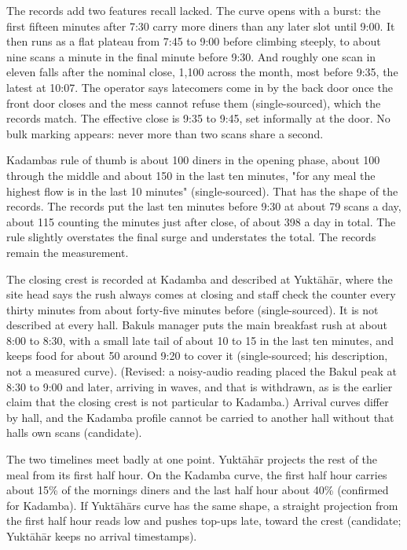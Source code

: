 \documentclass[
  10pt,
  table]{article}
\begin{document}
The records add two features recall lacked. The curve opens with a burst: the first fifteen minutes after 7:30 carry more diners than any later slot until 9:00. It then runs as a flat plateau from 7:45 to 9:00 before climbing steeply, to about nine scans a minute in the final minute before 9:30. And roughly one scan in eleven falls after the nominal close, 1,100 across the month, most before 9:35, the latest at 10:07. The operator says latecomers come in by the back door once the front door closes and the mess cannot refuse them (single-sourced), which the records match. The effective close is 9:35 to 9:45, set informally at the door. No bulk marking appears: never more than two scans share a second.

Kadamba\textquotesingle s rule of thumb is about 100 diners in the opening phase, about 100 through the middle and about 150 in the last ten minutes, "for any meal the highest flow is in the last 10 minutes" (single-sourced). That has the shape of the records. The records put the last ten minutes before 9:30 at about 79 scans a day, about 115 counting the minutes just after close, of about 398 a day in total. The rule slightly overstates the final surge and understates the total. The records remain the measurement.

The closing crest is recorded at Kadamba and described at Yuktāhār, where the site head says the rush always comes at closing and staff check the counter every thirty minutes from about forty-five minutes before (single-sourced). It is not described at every hall. Bakul\textquotesingle s manager puts the main breakfast rush at about 8:00 to 8:30, with a small late tail of about 10 to 15 in the last ten minutes, and keeps food for about 50 around 9:20 to cover it (single-sourced; his description, not a measured curve). (Revised: a noisy-audio reading placed the Bakul peak at 8:30 to 9:00 and later, arriving in waves, and that is withdrawn, as is the earlier claim that the closing crest is not particular to Kadamba.) Arrival curves differ by hall, and the Kadamba profile cannot be carried to another hall without that hall\textquotesingle s own scans (candidate).

The two timelines meet badly at one point. Yuktāhār projects the rest of the meal from its first half hour. On the Kadamba curve, the first half hour carries about 15\% of the morning\textquotesingle s diners and the last half hour about 40\% (confirmed for Kadamba). If Yuktāhār\textquotesingle s curve has the same shape, a straight projection from the first half hour reads low and pushes top-ups late, toward the crest (candidate; Yuktāhār keeps no arrival timestamps).
\end{document}
